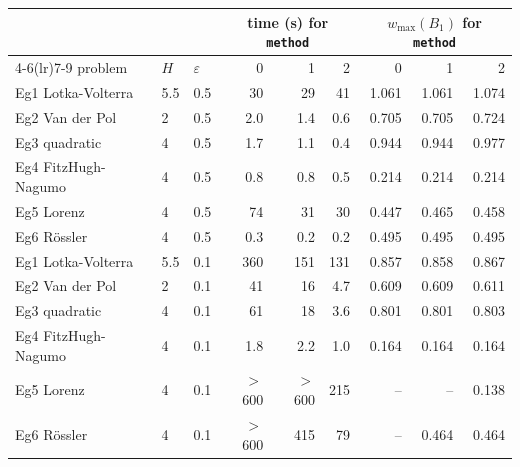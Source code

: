 \begin{tabular}{lll rrr rrr}
\toprule
& & & \multicolumn{3}{c}{time (s) for \texttt{method}} & \multicolumn{3}{c}{$w_{\max}(B_1)$ for \texttt{method}} \\
\cmidrule(lr){4-6}\cmidrule(lr){7-9}
problem & $H$ & $\varepsilon$ & 0 & 1 & 2 & 0 & 1 & 2 \\
\midrule
Eg1 Lotka-Volterra & 5.5 & 0.5 & 30 & 29 & 41 & 1.061 & 1.061 & 1.074 \\
Eg2 Van der Pol & 2 & 0.5 & 2.0 & 1.4 & 0.6 & 0.705 & 0.705 & 0.724 \\
Eg3 quadratic & 4 & 0.5 & 1.7 & 1.1 & 0.4 & 0.944 & 0.944 & 0.977 \\
Eg4 FitzHugh-Nagumo & 4 & 0.5 & 0.8 & 0.8 & 0.5 & 0.214 & 0.214 & 0.214 \\
Eg5 Lorenz & 4 & 0.5 & 74 & 31 & 30 & 0.447 & 0.465 & 0.458 \\
Eg6 R\"ossler & 4 & 0.5 & 0.3 & 0.2 & 0.2 & 0.495 & 0.495 & 0.495 \\
\addlinespace
Eg1 Lotka-Volterra & 5.5 & 0.1 & 360 & 151 & 131 & 0.857 & 0.858 & 0.867 \\
Eg2 Van der Pol & 2 & 0.1 & 41 & 16 & 4.7 & 0.609 & 0.609 & 0.611 \\
Eg3 quadratic & 4 & 0.1 & 61 & 18 & 3.6 & 0.801 & 0.801 & 0.803 \\
Eg4 FitzHugh-Nagumo & 4 & 0.1 & 1.8 & 2.2 & 1.0 & 0.164 & 0.164 & 0.164 \\
Eg5 Lorenz & 4 & 0.1 & $>$600 & $>$600 & 215 & -- & -- & 0.138 \\
Eg6 R\"ossler & 4 & 0.1 & $>$600 & 415 & 79 & -- & 0.464 & 0.464 \\
\bottomrule
\end{tabular}
